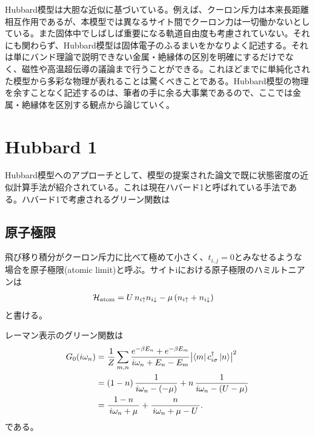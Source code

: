\documentclass{jarticle}
\begin{document}
Hubbard模型は大胆な近似に基づいている。例えば、クーロン斥力は本来長距離相互作用であるが、本模型では異なるサイト間でクーロン力は一切働かないとしている。また固体中でしばしば重要になる軌道自由度も考慮されていない。それにも関わらず、Hubbard模型は固体電子のふるまいをかなりよく記述する。それは単にバンド理論で説明できない金属・絶縁体の区別を明確にするだけでなく、磁性や高温超伝導の議論まで行うことができる。これほどまでに単純化された模型から多彩な物理が表れることは驚くべきことである。Hubbard模型の物理を余すことなく記述するのは、筆者の手に余る大事業であるので、ここでは金属・絶縁体を区別する観点から論じていく。

\section{Hubbard 1}
Hubbard模型へのアプローチとして、模型の提案された論文で既に状態密度の近似計算手法が紹介されている。これは現在ハバード1と呼ばれている手法である。ハバード1で考慮されるグリーン関数は
\subsection{原子極限}
飛び移り積分がクーロン斥力に比べて極めて小さく、$t_{i,j} = 0$とみなせるような場合を原子極限(atomic limit)と呼ぶ。サイトiにおける原子極限のハミルトニアンは
\begin{align}
  \mathcal{H}_{\rm atom}
  &= U\,n_{i\uparrow}n_{i\downarrow}
     - \mu\,(n_{i\uparrow} + n_{i\downarrow})
\end{align}
と書ける。

レーマン表示のグリーン関数は
\begin{align}
  G_0(i\omega_n)
  &= \frac{1}{Z}
     \sum_{m,n}
     \frac{e^{-\beta E_n} + e^{-\beta E_m}}
          {i\omega_n + E_n - E_m}
     \bigl|\langle m|\,c_{i\sigma}^\dagger\,|n\rangle\bigr|^2 \notag
  \\
  &= (1-n)\,\frac{1}{i\omega_n - ( -\mu )}
     + n\,\frac{1}{i\omega_n - (U-\mu)} \notag
  \\
  &= \frac{1-n}{\,i\omega_n+\mu\,}
     +\frac{n}{\,i\omega_n+\mu - U\,}.
\end{align}
である。
\end{document}

